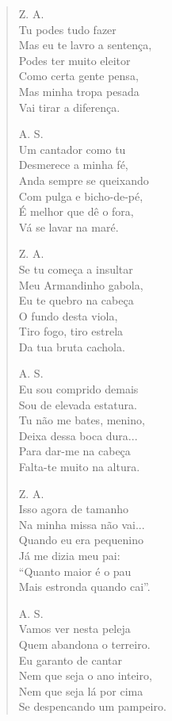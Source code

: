 \begin{verse}
Z. A.\\
Tu podes tudo fazer\\
Mas eu te lavro a sentença,\\
Podes ter muito eleitor\\
Como certa gente pensa,\\
Mas minha tropa pesada\\
Vai tirar a diferença.

A. S.\\
Um cantador como tu\\
Desmerece a minha fé,\\
Anda sempre se queixando\\
Com pulga e bicho-de-pé,\\
É melhor que dê o fora,\\
Vá se lavar na maré.
\pagebreak

Z. A.\\
Se tu começa a insultar\\
Meu Armandinho gabola,\\
Eu te quebro na cabeça\\
O fundo desta viola,\\
Tiro fogo, tiro estrela\\
Da tua bruta cachola.

A. S.\\
Eu sou comprido demais\\
Sou de elevada estatura.\\
Tu não me bates, menino,\\
Deixa dessa boca dura...\\
Para dar-me na cabeça\\
Falta-te muito na altura.

Z. A.\\
Isso agora de tamanho\\
Na minha missa não vai...\\
Quando eu era pequenino\\
Já me dizia meu pai:\\
“Quanto maior é o pau\\
Mais estronda quando cai”.

A. S.\\
Vamos ver nesta peleja\\
Quem abandona o terreiro.\\
Eu garanto de cantar\\
Nem que seja o ano inteiro,\\
Nem que seja lá por cima\\
Se despencando um pampeiro.
\pagebreak


\end{verse}
